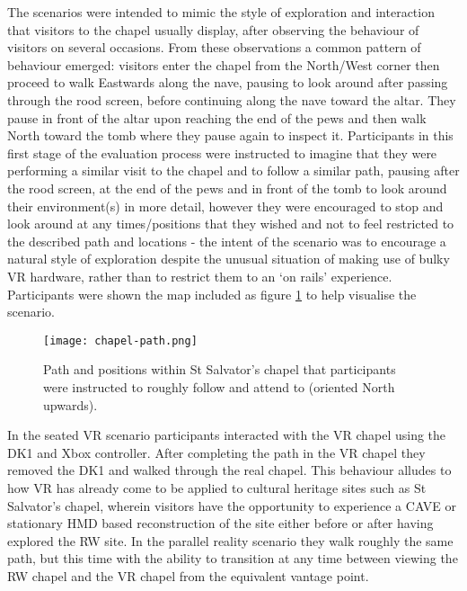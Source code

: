 The scenarios were intended to mimic the style of exploration and interaction that visitors to the chapel usually display, after observing the behaviour of visitors on several occasions. From these observations a common pattern of behaviour emerged: visitors enter the chapel from the North/West corner then proceed to walk Eastwards along the nave, pausing to look around after passing through the rood screen, before continuing along the nave toward the altar. They pause in front of the altar upon reaching the end of the pews and then walk North toward the tomb where they pause again to inspect it. Participants in this first stage of the evaluation process were instructed to imagine that they were performing a similar visit to the chapel and to follow a similar path, pausing after the rood screen, at the end of the pews and in front of the tomb to look around their environment(s) in more detail, however they were encouraged to stop and look around at any times/positions that they wished and not to feel restricted to the described path and locations - the intent of the scenario was to encourage a natural style of exploration despite the unusual situation of making use of bulky VR hardware, rather than to restrict them to an `on rails' experience. Participants were shown the map included as figure \ref{chapel-path} to help visualise the scenario.

\begin{figure}
	\begin{center}
		\texttt{[image: chapel-path.png]}
		\caption{Path and positions within St Salvator's chapel that participants were instructed to roughly follow and attend to (oriented North upwards).}
		\label{chapel-path}
	\end{center}
\end{figure}

In the seated VR scenario participants interacted with the VR chapel using the DK1 and Xbox controller. After completing the path in the VR chapel they removed the DK1 and walked through the real chapel. This behaviour alludes to how VR has already come to be applied to cultural heritage sites such as St Salvator's chapel, wherein visitors have the opportunity to experience a CAVE or stationary HMD based reconstruction of the site either before or after having explored the RW site. In the parallel reality scenario they walk roughly the same path, but this time with the ability to transition at any time between viewing the RW chapel and the VR chapel from the equivalent vantage point.

